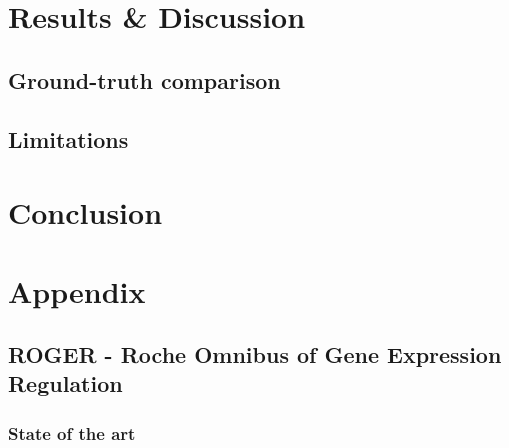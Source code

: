 \documentclass{thesisclass}
\begin{document}
\chapter{Results \& Discussion}
\label{ch:results}

\section{Ground-truth comparison}

\section{Limitations}

\chapter{Conclusion}
\label{ch:conclusion}





\cleardoublepage

\appendix

\chapter{Appendix}
\label{ch:appendix}


\section{ROGER - Roche Omnibus of Gene Expression Regulation} \label{sec:roger}

\subsection{State of the art}
\end{document}
